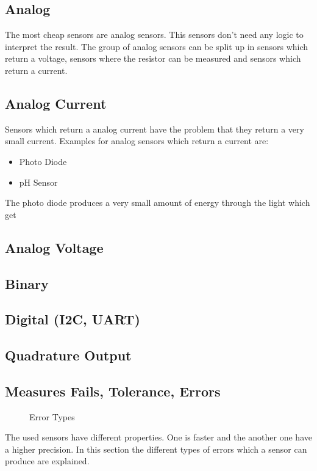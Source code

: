\subsection{Analog}
The most cheap sensors are analog sensors.
This sensors don't need any logic to interpret the result.
The group of analog sensors can be split up in sensors which return a voltage, sensors where the resistor can be measured and sensors which return a current.


\subsection{Analog Current}
Sensors which return a analog current have the problem that they return a very small current.
Examples for analog sensors which return a current are:
\begin{itemize}
\item Photo Diode
\item pH Sensor
\end{itemize}
The photo diode produces a very small amount of energy through the light which get 


\subsection{Analog Voltage}
 


\subsection{Binary}


\subsection{Digital (I2C, UART)}


\subsection{Quadrature Output}


\subsection{Measures Fails, Tolerance, Errors}
\begin{figure}
\caption{Error Types \cite{img:precisionDarts}}
\label{fig:errorTypes}
\end{figure}
The used sensors have different properties.
One is faster and the another one have a higher precision.
In this section the different types of errors which a sensor can produce are explained.


